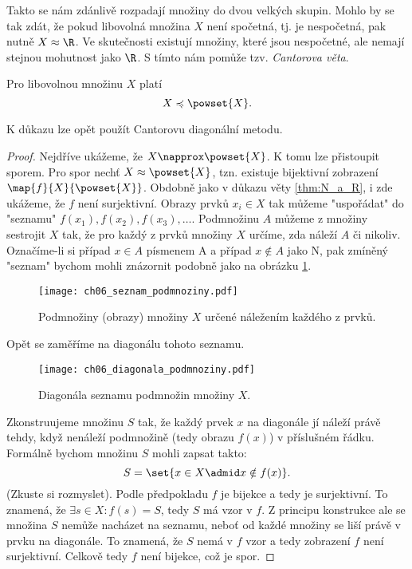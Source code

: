 Takto se nám zdánlivě rozpadají množiny do dvou velkých skupin. Mohlo by se tak zdát, že pokud libovolná množina $X$ není spočetná, tj. je nespočetná, pak nutně $X\approx\R$. Ve skutečnosti existují množiny, které jsou nespočetné, ale nemají stejnou mohutnost jako $\R$. S tímto nám pomůže tzv. \emph{Cantorova věta}.
\begin{theorem}[Cantorova]
    Pro libovolnou množinu $X$ platí
    \begin{equation*}
        X\preccurlyeq\powset{X}.
    \end{equation*}
\end{theorem}
K důkazu lze opět použít Cantorovu diagonální metodu.
\begin{proof}
    Nejdříve ukážeme, že $X\napprox\powset{X}$. K tomu lze přistoupit sporem. Pro spor nechť $X\approx\powset{X}$, tzn. existuje bijektivní zobrazení $\map{f}{X}{\powset{X}}$. Obdobně jako v důkazu věty \ref{thm:N_a_R}, i zde ukážeme, že $f$ není surjektivní. Obrazy prvků $x_i\in X$ tak můžeme "uspořádat" do "seznamu" $f(x_1),f(x_2),f(x_3),\dots$. Podmnožinu $A$ můžeme z množiny sestrojit $X$ tak, že pro každý z prvků množiny $X$ určíme, zda náleží $A$ či nikoliv. Označíme-li si případ $x\in A$ písmenem A a případ $x\notin A$ jako N, pak zmíněný "seznam" bychom mohli znázornit podobně jako na obrázku \ref{fig:seznam_podmnoziny}.
    \begin{figure}[H]
        \centering
        \texttt{[image: ch06\_seznam\_podmnoziny.pdf]}
        \caption{Podmnožiny (obrazy) množiny $X$ určené náležením každého z prvků.}
        \label{fig:seznam_podmnoziny}
    \end{figure}
    Opět se zaměříme na diagonálu tohoto seznamu.
    \begin{figure}[H]
        \centering
        \texttt{[image: ch06\_diagonala\_podmnoziny.pdf]}
        \caption{Diagonála seznamu podmnožin množiny $X$.}
        \label{fig:diagonala_podmnoziny}
    \end{figure}
    Zkonstruujeme množinu $S$ tak, že každý prvek $x$ na diagonále jí náleží právě tehdy, když nenáleží podmnožině (tedy obrazu $f(x)$) v příslušném řádku. Formálně bychom množinu $S$ mohli zapsat takto:
    \begin{equation*}
        S=\set{x\in X \admid x\notin f(x)}.
    \end{equation*}
    (Zkuste si rozmyslet). Podle předpokladu $f$ je bijekce a tedy je surjektivní. To znamená, že $\exists s\in X: f(s)=S$, tedy $S$ má vzor v $f$. Z principu konstrukce ale se množina $S$ nemůže nacházet na seznamu, neboť od každé množiny se liší právě v prvku na diagonále. To znamená, že $S$ nemá v $f$ vzor a tedy zobrazení $f$ není surjektivní. Celkově tedy $f$ není bijekce, což je spor.\par

\end{proof}
